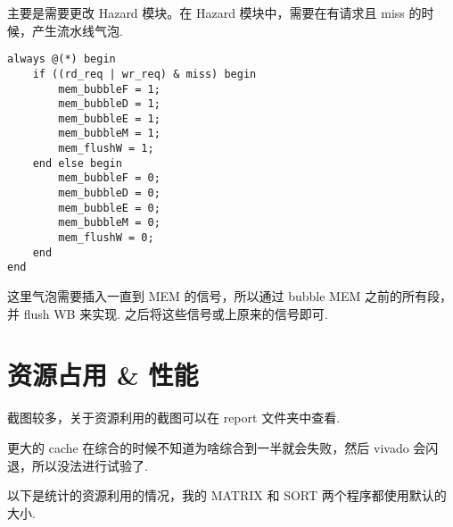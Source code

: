 \documentclass{article}
\begin{document}
主要是需要更改 Hazard 模块。在 Hazard 模块中，需要在有请求且 miss 的时候，产生流水线气泡.
\begin{verbatim}
always @(*) begin
    if ((rd_req | wr_req) & miss) begin
        mem_bubbleF = 1;
        mem_bubbleD = 1;
        mem_bubbleE = 1;
        mem_bubbleM = 1;
        mem_flushW = 1;
    end else begin
        mem_bubbleF = 0;
        mem_bubbleD = 0;
        mem_bubbleE = 0;
        mem_bubbleM = 0;
        mem_flushW = 0;
    end
end
\end{verbatim}
这里气泡需要插入一直到 MEM 的信号，所以通过 bubble MEM 之前的所有段，并 flush WB 来实现. 之后将这些信号或上原来的信号即可.

\section{资源占用 \& 性能}
截图较多，关于资源利用的截图可以在 report 文件夹中查看.

更大的 cache 在综合的时候不知道为啥综合到一半就会失败，然后 vivado 会闪退，所以没法进行试验了.

以下是统计的资源利用的情况，我的 MATRIX 和 SORT 两个程序都使用默认的大小.
\end{document}

